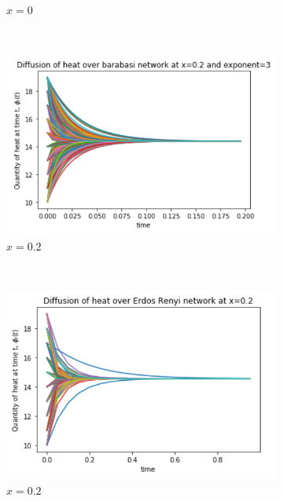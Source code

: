 \documentclass[10pt,a4paper]{article}
\begin{document}
\begin{figure}[!h]
\begin{subfigure}[b]{0.45\textwidth}
		\caption{$x=0$}
		\label{erdos-x01}
	\end{subfigure}\\
	\begin{subfigure}[b]{0.45\textwidth}
		\includegraphics[width= \textwidth]{images/barabasi-x02.png}
		\caption{$x=0.2$}
		\label{barabasi-x02}
	\end{subfigure}~
	\begin{subfigure}[b]{0.45\textwidth}
		\includegraphics[width= \textwidth]{images/erdos-x02.png}
		\caption{$x=0.2$}
		\label{erdos-x02}
	\end{subfigure}\\
	\begin{subfigure}[b]{0.45\textwidth}

\end{subfigure}
\end{figure}
\end{document}
